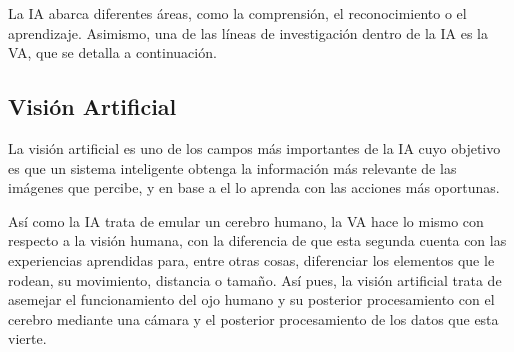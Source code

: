 La IA abarca diferentes áreas, como la comprensión, el reconocimiento o el aprendizaje. Asimismo, una de las líneas de investigación dentro de la IA es la VA, que se detalla a continuación.\\

\subsection{Visión Artificial}
\label{sec:subseccion}
La visión artificial es uno de los campos más importantes de la IA cuyo objetivo es que un sistema inteligente obtenga la información más relevante de las imágenes que percibe, y en base a el lo aprenda con las acciones más oportunas.

Así como la IA trata de emular un cerebro humano, la VA hace lo mismo con respecto a la visión humana, con la diferencia de que esta segunda cuenta con las experiencias aprendidas para, entre otras cosas, diferenciar los elementos que le rodean, su movimiento, distancia o tamaño. Así pues, la visión artificial trata de asemejar el funcionamiento del ojo humano y su posterior procesamiento con el cerebro mediante  una cámara y el posterior procesamiento de los datos que esta vierte.\\

